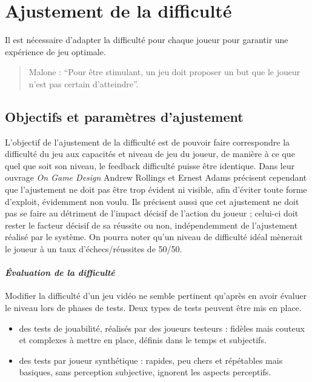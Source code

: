 \section{Ajustement de la difficulté}
Il est nécessaire d'adapter la difficulté pour chaque joueur pour garantir une expérience de jeu optimale.			
\begin{quote}Malone : “Pour être stimulant, un jeu doit proposer un but que le joueur n’est pas certain d’atteindre”.
\end{quote}

	\subsection{Objectifs et paramètres d'ajustement}
L’objectif de l’ajustement de la difficulté est de pouvoir faire correspondre la difficulté du jeu aux capacités et niveau de jeu du joueur, de manière à ce que quel que soit son niveau, le feedback difficulté puisse être identique. Dans leur ouvrage \emph{On Game Design} \cite{Andr03} Andrew Rollings et Ernest Adams précisent cependant que l’ajustement ne doit pas être trop évident ni visible, afin d’éviter toute forme d’exploit, évidemment non voulu. Ils précisent aussi que cet ajustement ne doit pas se faire au détriment de l’impact décisif de l’action du joueur ; celui-ci doit rester le facteur décisif de sa réussite ou non, indépendemment de l’ajustement réalisé par le système. On pourra noter qu’un niveau de difficulté idéal mènerait le joueur à un taux d’échecs/réussites de 50/50.

		\paragraph{\emph{Évaluation de la difficulté}\\ \quad}
Modifier la difficulté d'un jeu vidéo ne semble pertinent qu'après en avoir évaluer le niveau lors de phases de tests. Deux types de tests peuvent être mis en place. 
\begin{itemize}
	\item des tests de jouabilité, réalisés par des joueurs testeurs : fidèles mais couteux et complexes à mettre en place, définis dans le temps et subjectifs.
	\item des tests par joueur synthétique : rapides, peu chers et répétables mais basiques, sans perception subjective, ignorent les aspects perceptifs.
\end {itemize} 


